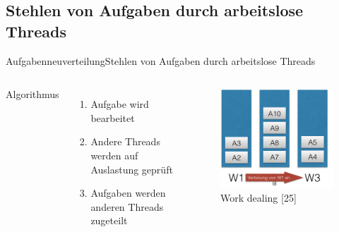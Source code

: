 \documentclass{beamer}
\begin{document}
\subsection{Stehlen von Aufgaben durch arbeitslose Threads}
\begin{frame}{Aufgabenneuverteilung}{Stehlen von Aufgaben durch arbeitslose Threads}
\begin{columns}

        Algorithmus
        \begin{enumerate}
        \item Aufgabe wird bearbeitet
        \item Andere Threads werden auf Auslastung gepr\"uft
        \item Aufgaben werden anderen Threads zugeteilt
        \end{enumerate}

        
        
        \begin{figure}
        \centering
        \includegraphics[width=1\columnwidth]{./assets/W1ToW3.png}
        \caption{Work dealing \cite{Herlihy1}[25]}
        \label{fig:my_label}
        \end{figure}
\end{columns}
\end{frame}
\end{document}
